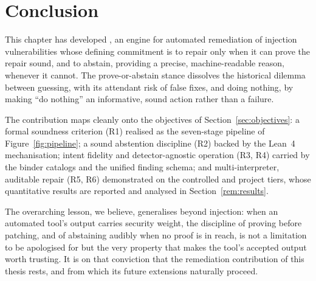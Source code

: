 \section{Conclusion}
\label{rem:conclusion}

This chapter has developed \irsam{}, an engine for automated remediation of
injection vulnerabilities whose defining commitment is to repair only when it
can prove the repair sound, and to abstain, providing a precise,
machine-readable reason, whenever it cannot. The prove-or-abstain stance
dissolves the historical dilemma between guessing, with its attendant risk of
false fixes, and doing nothing, by making ``do nothing'' an informative,
sound action rather than a failure.

The contribution maps cleanly onto the objectives of
Section~\ref{sec:objectives}: a formal soundness criterion (R1) realised as
the seven-stage pipeline of Figure~\ref{fig:pipeline}; a sound abstention
discipline (R2) backed by the Lean~4 mechanisation; intent fidelity and
detector-agnostic operation (R3, R4) carried by the binder catalogs and the
unified finding schema; and multi-interpreter, auditable repair (R5, R6)
demonstrated on the controlled and project tiers, whose quantitative results
are reported and analysed in Section~\ref{rem:results}.

The overarching lesson, we believe, generalises beyond injection: when an
automated tool's output carries security weight, the discipline of proving
before patching, and of abstaining audibly when no proof is in reach, is
not a limitation to be apologised for but the very property that makes the
tool's accepted output worth trusting. It is on that conviction that the
remediation contribution of this thesis rests, and from which its future
extensions naturally proceed. 